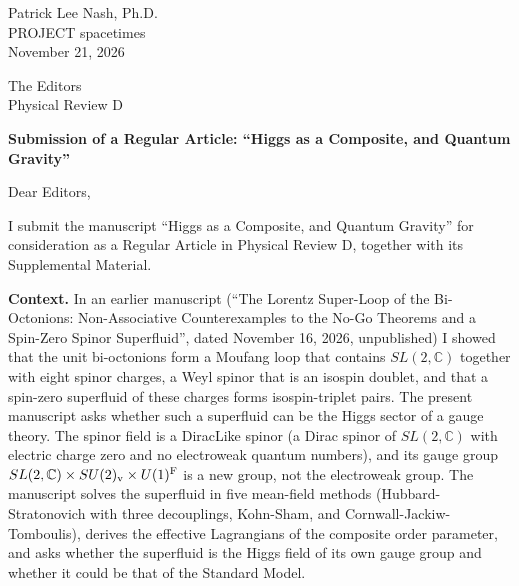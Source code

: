 \documentclass[11pt]{article}
\begin{document}
\begin{flushright}
Patrick Lee Nash, Ph.D.\\
PROJECT spacetimes\\
November 21, 2026
\end{flushright}

The Editors\\
Physical Review D

\textbf{Submission of a Regular Article: ``Higgs as a Composite, and Quantum Gravity''}

Dear Editors,

I submit the manuscript ``Higgs as a Composite, and Quantum Gravity'' for consideration as a Regular Article in
Physical Review D, together with its Supplemental Material.

\textbf{Context.} In an earlier manuscript (``The Lorentz Super-Loop of the Bi-Octonions: Non-Associative Counterexamples
to the No-Go Theorems and a Spin-Zero Spinor Superfluid'', dated November 16, 2026, unpublished) I showed that the unit
bi-octonions form a Moufang loop that contains $SL(2,\mathbb C)$ together with eight spinor charges, a Weyl spinor that is
an isospin doublet, and that a spin-zero superfluid of these charges forms isospin-triplet pairs. The present manuscript
asks whether such a superfluid can be the Higgs sector of a gauge theory. The spinor field is a DiracLike spinor (a Dirac
spinor of $SL(2,\mathbb C)$ with electric charge zero and no electroweak quantum numbers), and its gauge group
$SL(2,\mathbb C)\times SU(2)_{\rm v}\times U(1)^{\rm F}$ is a new group, not the electroweak group. The manuscript solves the
superfluid in five mean-field methods (Hubbard-Stratonovich with three decouplings, Kohn-Sham, and
Cornwall-Jackiw-Tomboulis), derives the effective Lagrangians of the composite order parameter, and asks whether the
superfluid is the Higgs field of its own gauge group and whether it could be that of the Standard Model.
\end{document}
